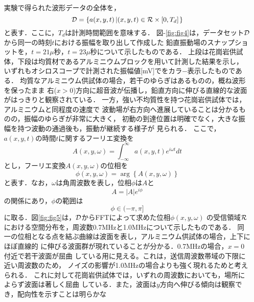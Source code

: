 ﻿%
実験で得られた波形データの全体を，
\begin{equation}
	{\cal D}=\left\{
		a(x,y,t)\left| (x,y,t)\in {\cal R}\times [0,T_d] \right.
	\right\}
	\label{eqn:dataset}
\end{equation}
と表す．ここに，$T_d$は計測時間範囲を意味する．
図-\ref{fig:fig4}は，データセット$\cal D$から同一の時刻$t$における振幅を取り出して作成した
鉛直振動場のスナップショットを，$t=21\mu$秒，$t=23\mu$秒について示したものである．
上段は花崗岩供試体，下段は均質材であるアルミニウムブロックを用いて計測した結果を示し，
いずれもオシロスコープで計測された振幅値[mV]でをカラ−表示したものである．
均質なアルミニウム供試体の場合，若干のゆらぎはあるものの，概ね波形を保ったまま
右($x>0$)方向に超音波が伝播し，鉛直方向に伸びる直線的な波面がはっきりと観察されている．
一方，強い不均質性を持つ花崗岩供試体では，アルミニウムと同程度の速度で
波動場が右方向へ進展していることは分かるものの，振幅のゆらぎが非常に大きく，
初動の到達位置は明確でなく，大きな振幅を持つ波動の通過後も，振動が継続する様子が
見られる．
ここで，$a(x,y,t)$の時間$t$に関するフーリエ変換を
\begin{equation}
	A(x,y,\omega)=\int_{-\infty}^{\infty} a(x,y,t)e^{i\omega t} dt
	\label{eqn:Fourier_t}
\end{equation}
とし，フーリエ変換$A(x,y,\omega)$の位相を
\begin{equation}
	\phi(x,y,\omega)=\arg\left\{ A(x,y,\omega) \right\}
	\label{eqn:phase}
\end{equation}
と表す．なお，$\omega$は角周波数を表し，位相$\phi$は$A$と
\begin{equation}
	A=\left| A \right|e^{i\phi}
	\label{eqn:phi2A}
\end{equation}
の関係にあり，$\phi$の範囲は
\begin{equation}
	\phi \in (-\pi,\pi]
	\label{eqn:dom_phi}
\end{equation}
に取る．図\ref{fig:fig5}は，$\cal D$からFFTによって求めた位相$\phi(x,y,\omega)$
の受信領域$\cal R$における空間分布を，周波数0.7MHzと1.0MHzについて示したものである．
同一の位相となる点を結ぶ曲線は波面を表し，アルミニウム供試体の場合，上下にほぼ直線的
に伸びる波面群が現れていることが分かる．0.7MHzの場合，$x=0$付近で若干波面が屈曲
している用に見える。これは，送信周波数帯域の下限に近い周波数のため，
ノイズの影響が1.0MHzの場合よりも強く現れるためと考えられる．
これに対して花崗岩供試体では，いずれの周波数においても，場所によらず波面は著しく屈曲
している．また，波面は$y$方向へ伸びる傾向は観察でき，配向性を示すことは明らかな

